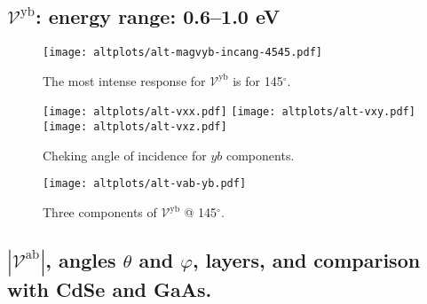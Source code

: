 \documentclass{article}
\let\Oldsubsection\subsection
\renewcommand{\subsection}{\FloatBarrier\Oldsubsection}
\begin{document}
\subsection{$\mathcal{V}^{\mathrm{yb}} $: energy range: 0.6--1.0 eV }
\begin{figure}[h]
    \centering
    \texttt{[image: altplots/alt-magvyb-incang-4545.pdf]}
    \caption{The most intense response for $\mathcal{V}^{\mathrm{yb}} $ is for 
    145$^{\circ}$.}
    \label{fig:alt-magvybincang1}
\end{figure}
\begin{figure}[ht]
    \centering
    \texttt{[image: altplots/alt-vxx.pdf]}
    \texttt{[image: altplots/alt-vxy.pdf]}\\
    \texttt{[image: altplots/alt-vxz.pdf]}
    \caption{Cheking angle of incidence for $yb$ components.}
    \label{fig:alt-ybangcomp}
\end{figure}
\begin{figure}[ht]
    \centering
    \texttt{[image: altplots/alt-vab-yb.pdf]}
    \caption{Three components of $\mathcal{V}^{\mathrm{yb}} $ @ 145$^{\circ}$.}
    \label{fig:alt-vyb1}
\end{figure}

\subsection{$|\mathcal{V}^{\mathrm{ab}}|$, angles
$\theta$ and $\varphi$, layers, and comparison with CdSe and GaAs.}


\end{document}
